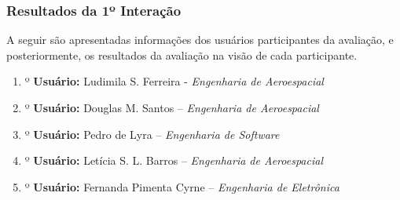 			\subsubsection[Resultados da 1º Interação]{Resultados da 1º Interação}
			\label{sec:terceiraAvaliacao_1_Resultados}

				A seguir são apresentadas informações dos usuários participantes da avaliação, e posteriormente, os resultados da avaliação na visão de cada participante.

				\begin{enumerate}
					\item{º \textbf{Usuário:} Ludimila S. Ferreira - \emph{Engenharia de Aeroespacial}}
					\item{º \textbf{Usuário:} Douglas M. Santos – \emph{Engenharia de Aeroespacial}}
					\item{º \textbf{Usuário:} Pedro de Lyra – \emph{Engenharia de Software}}
					\item{º \textbf{Usuário:} Letícia S. L. Barros – \emph{Engenharia de Aeroespacial}}
					\item{º \textbf{Usuário:} Fernanda Pimenta Cyrne – \emph{Engenharia de Eletrônica}}
				\end{enumerate}

